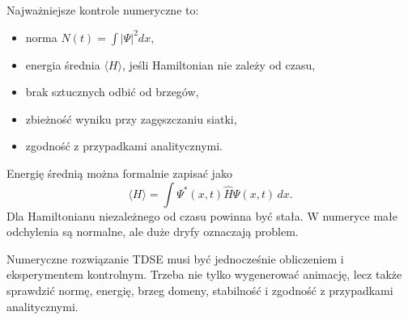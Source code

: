 Najważniejsze kontrole numeryczne to:
\begin{itemize}
    \item norma \(N(t)=\int |\Psi|^2dx\),
    \item energia średnia \(\langle H\rangle\), jeśli Hamiltonian nie zależy od czasu,
    \item brak sztucznych odbić od brzegów,
    \item zbieżność wyniku przy zagęszczaniu siatki,
    \item zgodność z przypadkami analitycznymi.
\end{itemize}

Energię średnią można formalnie zapisać jako
\begin{equation}
    \langle H\rangle=\int \Psi^*(x,t)\hat{H}\Psi(x,t)\,dx.
\end{equation}
Dla Hamiltonianu niezależnego od czasu powinna być stała. W numeryce małe odchylenia są normalne, ale duże dryfy oznaczają problem.

\begin{summarybox}
Numeryczne rozwiązanie TDSE musi być jednocześnie obliczeniem i eksperymentem kontrolnym. Trzeba nie tylko wygenerować animację, lecz także sprawdzić normę, energię, brzeg domeny, stabilność i zgodność z przypadkami analitycznymi.
\end{summarybox}
